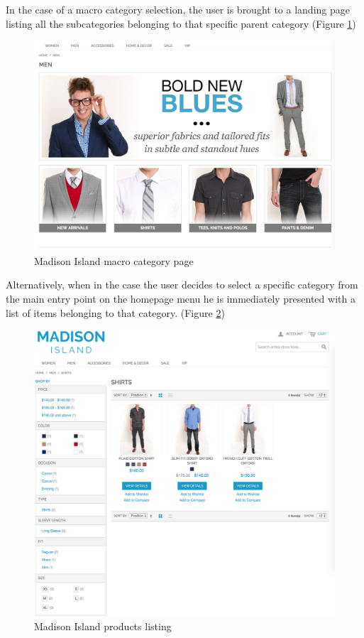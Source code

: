 In the case of a macro category selection, the user is brought to a landing page listing all the subcategories belonging to that specific parent category (Figure \ref{fig:category-cms})

\vspace{0.5cm}
\begin{figure}[htbp]
  \centering
    \includegraphics[width=12cm]{images/madison/category-cms.png}
  \caption{Madison Island macro category page}
  \label{fig:category-cms}
\end{figure}
\vspace{0.5cm}

Alternatively, when in the case the user decides to select a specific category from the main entry point on the homepage menu he is immediately presented with a list of items belonging to that category. (Figure \ref{fig:products-list})

\vspace{0.5cm}
\begin{figure}[htbp]
  \centering
    \includegraphics[width=12cm]{images/madison/products-list.png}
  \caption{Madison Island products listing}
  \label{fig:products-list}
\end{figure}
\vspace{0.5cm}

